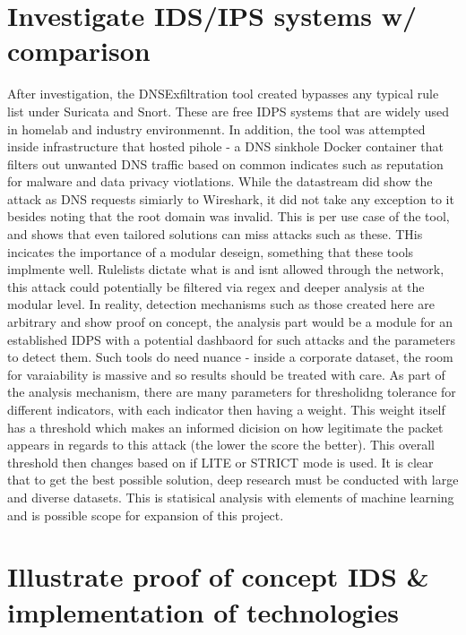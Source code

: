 \chapter{Investigate IDS/IPS systems w/ comparison}
After investigation, the DNSExfiltration tool created bypasses any typical rule list under Suricata and Snort. These are free IDPS systems that are widely used in homelab and industry environmennt. In addition, the tool was attempted inside infrastructure that hosted pihole - a DNS sinkhole Docker container that filters out unwanted DNS traffic based on common indicates such as reputation for malware and data privacy viotlations.
While the datastream did show the attack as DNS requests simiarly to Wireshark, it did not take any exception to it besides noting that the root domain was invalid. This is per use case of the tool, and shows that even tailored solutions can miss attacks such as these. THis incicates the importance of a modular deseign, something that these tools implmente well. Rulelists dictate what is and isnt allowed through the network, this attack could potentially be filtered 
via regex and deeper analysis at the modular level. In reality, detection mechanisms such as those created here are arbitrary and show proof on concept, the analysis part would be a module for an established IDPS with a potential dashbaord for such attacks and the parameters to detect them. Such tools do need nuance - inside a corporate dataset, the room for varaiability is massive and so results should be treated with care. As part of the analysis mechanism, there are many parameters for thresholidng tolerance for different indicators,
with each indicator then having a weight. This weight itself has a threshold which makes an informed dicision on how legitimate the packet appears in regards to this attack (the lower the score the better). This overall threshold then changes based on if LITE or STRICT mode is used. It is clear that to get the best possible solution, deep research must be conducted with large and diverse datasets. This is statisical analysis with elements of machine learning and is possible scope for expansion of this project. 



\chapter{Illustrate proof of concept IDS \& implementation of technologies}

